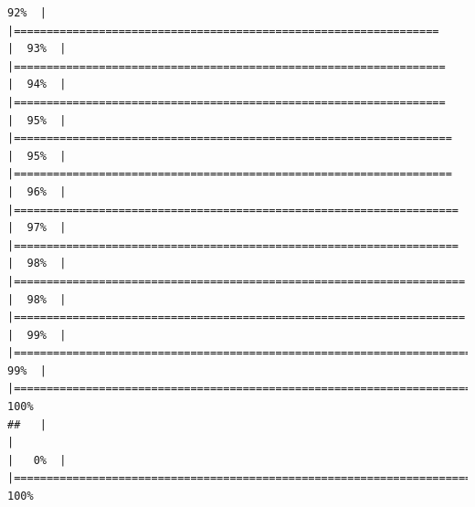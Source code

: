 \documentclass[
  english,
  man,a4paper,mask,floatsintext]{apa6}
\begin{document}
\begin{verbatim}
92%  |                                                                              |=================================================================     |  93%  |                                                                              |==================================================================    |  94%  |                                                                              |==================================================================    |  95%  |                                                                              |===================================================================   |  95%  |                                                                              |===================================================================   |  96%  |                                                                              |====================================================================  |  97%  |                                                                              |====================================================================  |  98%  |                                                                              |===================================================================== |  98%  |                                                                              |===================================================================== |  99%  |                                                                              |======================================================================|  99%  |                                                                              |======================================================================| 100%
##   |                                                                              |                                                                      |   0%  |                                                                              |======================================================================| 100%

\end{verbatim}
\end{document}
